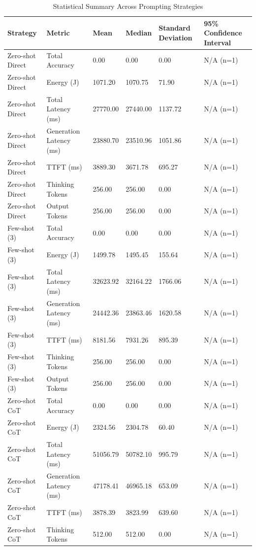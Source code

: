 \begin{table}
\caption{Statistical Summary Across Prompting Strategies}
\label{tab:statistical_summary}
\begin{tabular}{llllll}
\toprule
Strategy & Metric & Mean & Median & Standard Deviation & 95\% Confidence Interval \\
\midrule
Zero-shot Direct & Total Accuracy & 0.00 & 0.00 & 0.00 & N/A (n=1) \\
Zero-shot Direct & Energy (J) & 1071.20 & 1070.75 & 71.90 & N/A (n=1) \\
Zero-shot Direct & Total Latency (ms) & 27770.00 & 27440.00 & 1137.72 & N/A (n=1) \\
Zero-shot Direct & Generation Latency (ms) & 23880.70 & 23510.96 & 1051.86 & N/A (n=1) \\
Zero-shot Direct & TTFT (ms) & 3889.30 & 3671.78 & 695.27 & N/A (n=1) \\
Zero-shot Direct & Thinking Tokens & 256.00 & 256.00 & 0.00 & N/A (n=1) \\
Zero-shot Direct & Output Tokens & 256.00 & 256.00 & 0.00 & N/A (n=1) \\
Few-shot (3) & Total Accuracy & 0.00 & 0.00 & 0.00 & N/A (n=1) \\
Few-shot (3) & Energy (J) & 1499.78 & 1495.45 & 155.64 & N/A (n=1) \\
Few-shot (3) & Total Latency (ms) & 32623.92 & 32164.22 & 1766.06 & N/A (n=1) \\
Few-shot (3) & Generation Latency (ms) & 24442.36 & 23863.46 & 1620.58 & N/A (n=1) \\
Few-shot (3) & TTFT (ms) & 8181.56 & 7931.26 & 895.39 & N/A (n=1) \\
Few-shot (3) & Thinking Tokens & 256.00 & 256.00 & 0.00 & N/A (n=1) \\
Few-shot (3) & Output Tokens & 256.00 & 256.00 & 0.00 & N/A (n=1) \\
Zero-shot CoT & Total Accuracy & 0.00 & 0.00 & 0.00 & N/A (n=1) \\
Zero-shot CoT & Energy (J) & 2324.56 & 2304.78 & 60.40 & N/A (n=1) \\
Zero-shot CoT & Total Latency (ms) & 51056.79 & 50782.10 & 995.79 & N/A (n=1) \\
Zero-shot CoT & Generation Latency (ms) & 47178.41 & 46965.18 & 653.09 & N/A (n=1) \\
Zero-shot CoT & TTFT (ms) & 3878.39 & 3823.99 & 639.60 & N/A (n=1) \\
Zero-shot CoT & Thinking Tokens & 512.00 & 512.00 & 0.00 & N/A (n=1) \\

\end{tabular}
\end{table}

